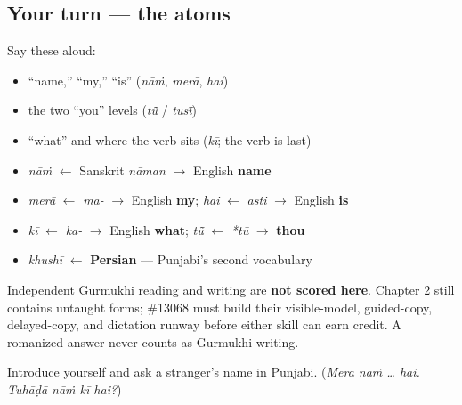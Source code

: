\subsection*{Your turn — the atoms}
Say these aloud:

\begin{itemize}
\raggedright
  \item \textquotedblleft{}name,\textquotedblright{} \textquotedblleft{}my,\textquotedblright{} \textquotedblleft{}is\textquotedblright{} (\emph{nāṁ}, \emph{merā}, \emph{hai})
  \item the two \textquotedblleft{}you\textquotedblright{} levels (\emph{tū̃} / \emph{tusī̃})
  \item \textquotedblleft{}what\textquotedblright{} and where the verb sits (\emph{kī}; the verb is last)
\end{itemize}

\begin{cousinweb}
\begin{itemize}
\raggedright
  \item \emph{nāṁ} $\leftarrow$ Sanskrit \emph{nāman} $\to$ English \textbf{name}
  \item \emph{merā} $\leftarrow$ \emph{ma-} $\to$ English \textbf{my}; \emph{hai} $\leftarrow$ \emph{asti} $\to$ English \textbf{is}
  \item \emph{kī} $\leftarrow$ \emph{ka-} $\to$ English \textbf{what}; \emph{tū̃} $\leftarrow$ \emph{*tū} $\to$ \textbf{thou}
  \item \emph{khushī} $\leftarrow$ \textbf{Persian} — Punjabi's second vocabulary
\end{itemize}
\end{cousinweb}

\begin{tcolorbox}[breakable,colback=teal!4,colframe=teal!35!black,title={Before you move on}]
Independent Gurmukhi reading and writing are \textbf{not scored here}. Chapter 2 still contains untaught forms; \#13068 must build their visible-model, guided-copy, delayed-copy, and dictation runway before either skill can earn credit. A romanized answer never counts as Gurmukhi writing.

Introduce yourself and ask a stranger's name in Punjabi. (\emph{Merā nāṁ … hai. Tuhāḍā nāṁ kī hai?})
\end{tcolorbox}
